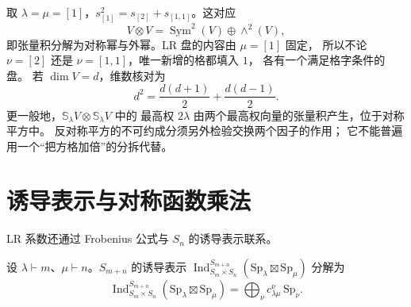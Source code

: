 \begin{example}
取 $\lambda=\mu=[1]$，$s_{[1]}^2=s_{[2]}+s_{[1,1]}$。这对应
\[
V\otimes V=\operatorname{Sym}^2(V)\oplus\wedge^2(V),
\]
即张量积分解为对称幂与外幂。LR 盘的内容由 $\mu=[1]$ 固定，
所以不论 $\nu=[2]$ 还是 $\nu=[1,1]$，唯一新增的格都填入 $1$，
各有一个满足格字条件的盘。
若 $\dim V=d$，维数核对为
\[
d^2=\frac{d(d+1)}2+\frac{d(d-1)}2.
\]
更一般地，$\mathbb S_\lambda V\otimes\mathbb S_\lambda V$ 中的
最高权 $2\lambda$ 由两个最高权向量的张量积产生，位于对称平方中。
反对称平方的不可约成分须另外检验交换两个因子的作用；
它不能普遍用一个“把方格加倍”的分拆代替。

\end{example}

\section{诱导表示与对称函数乘法}

LR 系数还通过 Frobenius 公式与 $S_n$ 的诱导表示联系。

\begin{proposition}[LR 系数与诱导表示]
设 $\lambda\vdash m$、$\mu\vdash n$。$S_{m+n}$ 的诱导表示 $\operatorname{Ind}_{S_m\times S_n}^{S_{m+n}}(\mathrm{Sp}_\lambda\boxtimes\mathrm{Sp}_\mu)$ 分解为
\begin{equation}
\operatorname{Ind}_{S_m\times S_n}^{S_{m+n}}(\mathrm{Sp}_\lambda\boxtimes\mathrm{Sp}_\mu)
=\bigoplus_\nu c_{\lambda\mu}^\nu\,\mathrm{Sp}_\nu.
\label{eq:lr-induction}
\end{equation}
\label{prop:lr-induction}
\end{proposition}


